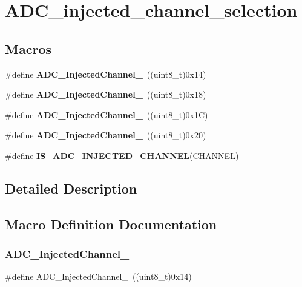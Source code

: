 \section{A\+D\+C\+\_\+injected\+\_\+channel\+\_\+selection}
\label{group__ADC__injected__channel__selection}
\subsection*{Macros}
\begin{DoxyCompactItemize}
\item 
\#define \textbf{ A\+D\+C\+\_\+\+Injected\+Channel\+\_}~((uint8\+\_\+t)0x14)
\item 
\#define \textbf{ A\+D\+C\+\_\+\+Injected\+Channel\+\_}~((uint8\+\_\+t)0x18)
\item 
\#define \textbf{ A\+D\+C\+\_\+\+Injected\+Channel\+\_}~((uint8\+\_\+t)0x1\+C)
\item 
\#define \textbf{ A\+D\+C\+\_\+\+Injected\+Channel\+\_}~((uint8\+\_\+t)0x20)
\item 
\#define \textbf{ I\+S\+\_\+\+A\+D\+C\+\_\+\+I\+N\+J\+E\+C\+T\+E\+D\+\_\+\+C\+H\+A\+N\+N\+EL}(C\+H\+A\+N\+N\+EL)
\end{DoxyCompactItemize}


\subsection{Detailed Description}


\subsection{Macro Definition Documentation}
\mbox{\label{group__ADC__injected__channel__selection_ga8792d4ae0fa82dd317252c72815684ba}} 
\subsubsection{A\+D\+C\+\_\+\+Injected\+Channel\+\_}
{\footnotesize\ttfamily \#define A\+D\+C\+\_\+\+Injected\+Channel\+\_~((uint8\+\_\+t)0x14)}




